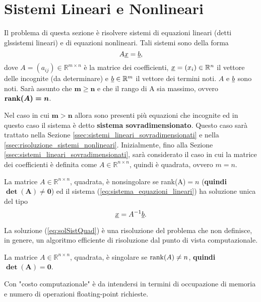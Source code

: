 \section{Sistemi Lineari e Nonlineari}
Il problema di questa sezione è risolvere sistemi di \gls{equazioni lineari} (detti gls{sistemi lineari}) e di equazioni nonlineari. Tali sistemi sono della forma 
\begin{equation}\label{eq:sistema_equazioni_lineari}
    A\uline{x}=\uline b,
\end{equation}
dove $A=(a_{ij})\in{\mathbb R^{m\times n}}$ è la matrice dei coefficienti, $\uline x=(x_i)\in\mathbb R^n$ il vettore delle incognite (da determinare) e $\uline b\in\mathbb R^m$ il vettore dei termini noti. $A$ e $\uline b$ sono noti. Sarà assunto che $\boldsymbol{m\geq n}$ e che il rango di A sia massimo, ovvero $\boldsymbol{\operatorname{rank}(A)=n}$.

Nel caso in cui $\boldsymbol{m>n}$ allora sono presenti più equazioni che incognite ed in questo caso il sistema è detto \textbf{sistema sovradimensionato}. Questo caso sarà trattato nella Sezione \ref{ssec:sistemi_lineari_sovradimensionati} e nella \ref{ssec:risoluzione_sistemi_nonlineari}. Inizialmente, fino alla Sezione \ref{ssec:sistemi_lineari_sovradimensionati}, sarà considerato il caso in cui la matrice dei coefficienti è definita come $A\in\mathbb R^{n\times n}$, quindi è quadrata, ovvero $m=n$.

\begin{definition}\label{def:matrice_ nonsingolare}
    La matrice $A\in\mathbb R^{n\times n}$, quadrata, è nonsingolare se \gls{rank(A)}$=n$ (\textbf{quindi} $\boldsymbol{\det(A)\neq 0}$) ed il sistema (\ref{eq:sistema_equazioni_lineari}) ha soluzione unica del tipo
    \begin{equation}\label{eq:solSistQuad}
        \uline x = A^{-1} \uline b.
    \end{equation}
\end{definition}
La soluzione (\ref{eq:solSistQuad}) è una risoluzione del problema che non definisce, in genere, un algoritmo efficiente di risoluzione dal punto di vista computazionale.

\begin{definition}\label{def:matrice_singolare}
	La matrice $A\in\mathbb R^{n\times n}$, quadrata, è singolare se $\operatorname{rank}(A)\neq n$, \textbf{quindi} $\boldsymbol{\det(A) = 0}$.
\end{definition}

\begin{remark}
    Con "costo computazionale" è da intendersi in termini di occupazione di memoria e numero di operazioni floating-point richieste.
\end{remark}

